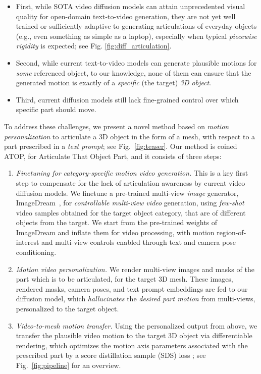 \begin{itemize}[leftmargin=*]
\item First, while SOTA video diffusion models 
can attain unprecedented visual quality for open-domain text-to-video generation, they are not yet well trained or sufficiently adaptive to generating articulations of everyday objects (e.g., even something as simple as a laptop), especially when typical {\em piecewise rigidity\/} is expected; see Fig. \ref{fig:diff_articulation}. 
\item Second, while current text-to-video models can generate plausible motions for {\em some\/} referenced object, to our knowledge, none of them can ensure that the generated motion is exactly of a {\em specific\/} (the target) {\em 3D object\/}.
\item Third, current diffusion models still lack fine-grained control over which specific part should move.
\end{itemize}




To address these challenges, we present a novel method based on {\em motion personalization\/} to articulate a 3D object in the form of a mesh, with respect to a part prescribed in a {\em text prompt\/}; see Fig.~\ref{fig:teaser}.
Our method is coined ATOP, for Articulate That Object Part, and it consists of three steps:
\begin{enumerate}[itemsep=2pt, parsep=0pt, topsep=2pt, leftmargin=*]
\item {\em Finetuning for category-specific motion video generation.} This is a key first step to compensate for the lack of articulation awareness by current video diffusion models. We finetune a pre-trained multi-view \textit{image} generator, ImageDream~\cite{wang2023imagedream}, for \textit{controllable multi-view video} generation, using {\em few-shot\/} video samples obtained for the target object category, that are of different objects from the target. We start from the pre-trained weights of ImageDream and inflate them for video processing, with motion region-of-interest and multi-view controls enabled through text and camera pose conditioning.

\item {\em Motion video personalization.}
We render multi-view images and masks of the part which is to be articulated, for the target 3D mesh. These images, rendered masks, camera poses, and text prompt embeddings are fed to our diffusion model, which \textit{hallucinates} the {\em desired part motion} from multi-views, personalized to the target object.
\item {\em Video-to-mesh motion transfer.}
Using the personalized output from above, we transfer the plausible video motion to the target 3D object via differentiable rendering, which optimizes the motion axis parameters associated with the prescribed part by a score distillation sample (SDS) loss \cite{poole2022dreamfusion}; see Fig.~\ref{fig:pipeline} for an overview.
\end{enumerate}

